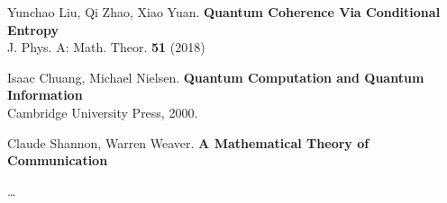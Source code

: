 \documentclass[12pt]{article}
\begin{document}

\vfill



\begin{thebibliography}{}

\item Yunchao Liu, Qi Zhao, Xiao Yuan. \textbf{Quantum Coherence Via Conditional Entropy} \\
J. Phys. A: Math. Theor. \textbf{51} (2018)
\item Isaac Chuang, Michael Nielsen. \textbf{Quantum Computation and Quantum Information} \\ Cambridge University Press, 2000.
\item Claude Shannon, Warren Weaver. \textbf{A Mathematical Theory of Communication} 
\item \dots 

\end{thebibliography}
\end{document}
